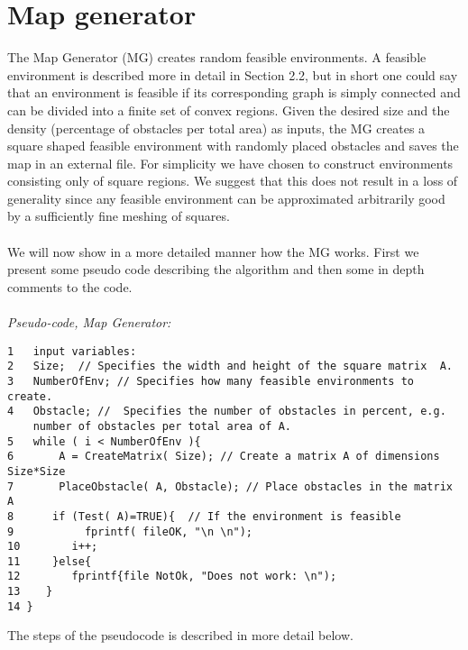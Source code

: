 \section{Map generator}
The Map Generator (MG) creates random feasible environments. A feasible environment is described more in detail in Section 2.2, but in short one could say that an environment is feasible if its corresponding graph is simply connected and can be divided into a finite set of convex regions. Given the desired size and the density (percentage of obstacles per total area) as inputs, the MG creates a square shaped feasible environment with randomly placed obstacles and saves the map in an external file. For simplicity we have chosen to construct environments consisting only of square regions. %
We suggest that this does not result in a loss of generality since any feasible environment can be approximated arbitrarily good by a sufficiently fine meshing of squares. \\ %
\\We will now show in a more detailed manner how the MG works. First we present some pseudo code describing the algorithm and then some in depth comments to the code.\\
\\\noindent\emph{Pseudo-code, Map Generator:}
\begin{verbatim}
1   input variables:
2   Size;  // Specifies the width and height of the square matrix  A.
3   NumberOfEnv; // Specifies how many feasible environments to create.
4   Obstacle; //  Specifies the number of obstacles in percent, e.g. 
    number of obstacles per total area of A.
5   while ( i < NumberOfEnv ){
6       A = CreateMatrix( Size); // Create a matrix A of dimensions Size*Size
7       PlaceObstacle( A, Obstacle); // Place obstacles in the matrix A
8      if (Test( A)=TRUE){  // If the environment is feasible
9           fprintf( fileOK, "\n \n");
10        i++;
11     }else{
12        fprintf{file NotOk, "Does not work: \n");
13    }
14 }
\end{verbatim}
The steps of the pseudocode is described in more detail below.
